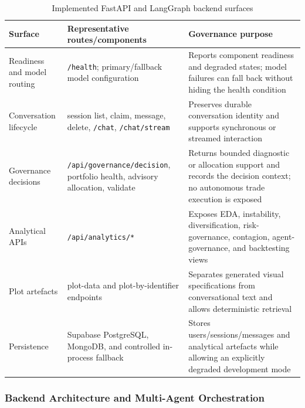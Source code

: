 \documentclass[11pt]{article}
\begin{document}
\begin{table}[htbp]
\centering
\small
\caption{Implemented FastAPI and LangGraph backend surfaces}
\label{tab:backend-implementation}
\begin{tabular}{L{3.3cm}L{4.5cm}L{5.3cm}}
\toprule
\textbf{Surface} & \textbf{Representative routes/components} & \textbf{Governance purpose} \\
\midrule
Readiness and model routing & \texttt{/health}; primary/fallback model configuration & Reports component readiness and degraded states; model failures can fall back without hiding the health condition \\
Conversation lifecycle & session list, claim, message, delete, \texttt{/chat}, \texttt{/chat/stream} & Preserves durable conversation identity and supports synchronous or streamed interaction \\
Governance decisions & \texttt{/api/governance/decision}, portfolio health, advisory allocation, validate & Returns bounded diagnostic or allocation support and records the decision context; no autonomous trade execution is exposed \\
Analytical APIs & \texttt{/api/analytics/*} & Exposes EDA, instability, diversification, risk-governance, contagion, agent-governance, and backtesting views \\
Plot artefacts & plot-data and plot-by-identifier endpoints & Separates generated visual specifications from conversational text and allows deterministic retrieval \\
Persistence & Supabase PostgreSQL, MongoDB, and controlled in-process fallback & Stores users/sessions/messages and analytical artefacts while allowing an explicitly degraded development mode \\
\bottomrule
\end{tabular}
\end{table}

\subsubsection{Backend Architecture and Multi-Agent Orchestration}
\label{sec:backend-implementation-detail}
\end{document}
